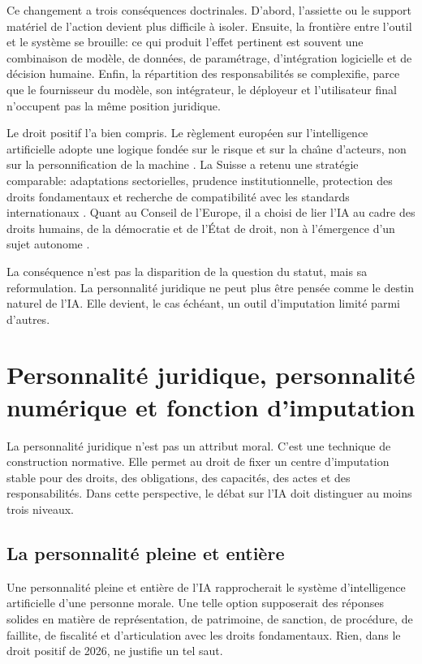 \documentclass[11pt]{article}
\begin{document}
Ce changement a trois cons{\'e}quences doctrinales. D'abord, l'assiette ou le support mat{\'e}riel de l'action devient plus difficile {\`a} isoler. Ensuite, la fronti{\`e}re entre l'outil et le syst{\`e}me se brouille: ce qui produit l'effet pertinent est souvent une combinaison de mod{\`e}le, de donn{\'e}es, de param{\'e}trage, d'int{\'e}gration logicielle et de d{\'e}cision humaine. Enfin, la r{\'e}partition des responsabilit{\'e}s se complexifie, parce que le fournisseur du mod{\`e}le, son int{\'e}grateur, le d{\'e}ployeur et l'utilisateur final n'occupent pas la m{\^e}me position juridique.

Le droit positif l'a bien compris. Le r{\`e}glement europ{\'e}en sur l'intelligence artificielle adopte une logique fond{\'e}e sur le risque et sur la cha{\^\i}ne d'acteurs, non sur la personnification de la machine \citep{eu2024aiact,ec2026aiactfaq}. La Suisse a retenu une strat{\'e}gie comparable: adaptations sectorielles, prudence institutionnelle, protection des droits fondamentaux et recherche de compatibilit{\'e} avec les standards internationaux \citep{ofcom2025swissai}. Quant au Conseil de l'Europe, il a choisi de lier l'IA au cadre des droits humains, de la d{\'e}mocratie et de l'{\'E}tat de droit, non {\`a} l'{\'e}mergence d'un sujet autonome \citep{coe2024framework}.

La cons{\'e}quence n'est pas la disparition de la question du statut, mais sa reformulation. La personnalit{\'e} juridique ne peut plus {\^e}tre pens{\'e}e comme le destin naturel de l'IA. Elle devient, le cas {\'e}ch{\'e}ant, un outil d'imputation limit{\'e} parmi d'autres.

\section{Personnalit{\'e} juridique, personnalit{\'e} num{\'e}rique et fonction d'imputation}
La personnalit{\'e} juridique n'est pas un attribut moral. C'est une technique de construction normative. Elle permet au droit de fixer un centre d'imputation stable pour des droits, des obligations, des capacit{\'e}s, des actes et des responsabilit{\'e}s. Dans cette perspective, le d{\'e}bat sur l'IA doit distinguer au moins trois niveaux.

\subsection{La personnalit{\'e} pleine et enti{\`e}re}
Une personnalit{\'e} pleine et enti{\`e}re de l'IA rapprocherait le syst{\`e}me d'intelligence artificielle d'une personne morale. Une telle option supposerait des r{\'e}ponses solides en mati{\`e}re de repr{\'e}sentation, de patrimoine, de sanction, de proc{\'e}dure, de faillite, de fiscalit{\'e} et d'articulation avec les droits fondamentaux. Rien, dans le droit positif de 2026, ne justifie un tel saut.
\end{document}
